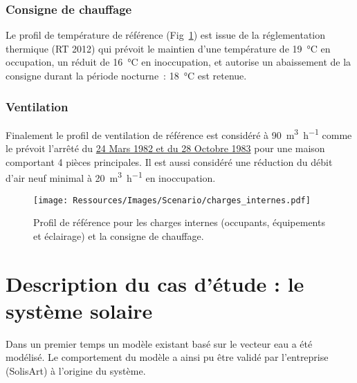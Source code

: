 \subsubsection{Consigne de chauffage} %
\label{ssub:consigne_de_chauffage}
Le profil de température de référence (Fig~\ref{fig:scenario_reference}) est issue de la
réglementation thermique (RT 2012) qui prévoit le maintien d’une température de
\SI{19}{\celsius} en occupation, un réduit de \SI{16}{\celsius} en inoccupation, et
autorise un abaissement de la consigne durant la période nocturne~: \SI{18}{\celsius} est
retenue.

\subsubsection{Ventilation} %
\label{ssub:ventilation_ref}
Finalement le profil de ventilation de référence est considéré à \SI[per-mode=symbol]{90}{\meter\cubed\per\hour}
comme le prévoit l’arrêté du \href{https://www.legifrance.gouv.fr/affichTexte.do?cidTexte=JORFTEXT000000862344}{24 Mars
1982 et du 28 Octobre 1983} pour une maison comportant 4 pièces principales. Il est aussi
considéré une réduction du débit d’air neuf minimal à \SI[per-mode=symbol]{20}{\meter\cubed\per\hour}
en inoccupation.

\begin{figure}
    \begin{center}
        \texttt{[image: Ressources/Images/Scenario/charges\_internes.pdf]}
    \end{center}
    \caption{Profil de référence pour les charges internes (occupants, équipements et éclairage)
             et la consigne de chauffage.
             \label{fig:scenario_reference}}
\end{figure}




\section{Description du cas d’étude : le système solaire} %
\label{sec:description_du_cas_d_etude_le_systeme_solaire}
Dans un premier temps un modèle existant basé sur le vecteur eau a été modélisé.
Le comportement du modèle a ainsi pu être validé par l’entreprise (SolisArt) à
l’origine du système.

